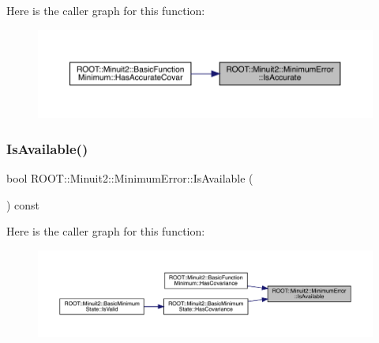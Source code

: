 Here is the caller graph for this function\+:\nopagebreak
\begin{figure}[H]
\begin{center}
\leavevmode
\includegraphics[width=350pt]{d5/d32/classROOT_1_1Minuit2_1_1MinimumError_a70c9ff6b59f2c01e5e54b4010326753d_icgraph}
\end{center}
\end{figure}
\mbox{\label{classROOT_1_1Minuit2_1_1MinimumError_af03638c23ec7b5573c139810cdb640c0}} 
\subsubsection{\texorpdfstring{IsAvailable()}{IsAvailable()}\hspace{0.1cm}{\footnotesize\ttfamily [1/2]}}
{\footnotesize\ttfamily bool R\+O\+O\+T\+::\+Minuit2\+::\+Minimum\+Error\+::\+Is\+Available (\begin{DoxyParamCaption}{ }\end{DoxyParamCaption}) const\hspace{0.3cm}{\ttfamily [inline]}}

Here is the caller graph for this function\+:\nopagebreak
\begin{figure}[H]
\begin{center}
\leavevmode
\includegraphics[width=350pt]{d5/d32/classROOT_1_1Minuit2_1_1MinimumError_af03638c23ec7b5573c139810cdb640c0_icgraph}
\end{center}
\end{figure}
\mbox{\label{classROOT_1_1Minuit2_1_1MinimumError_af03638c23ec7b5573c139810cdb640c0}} 

